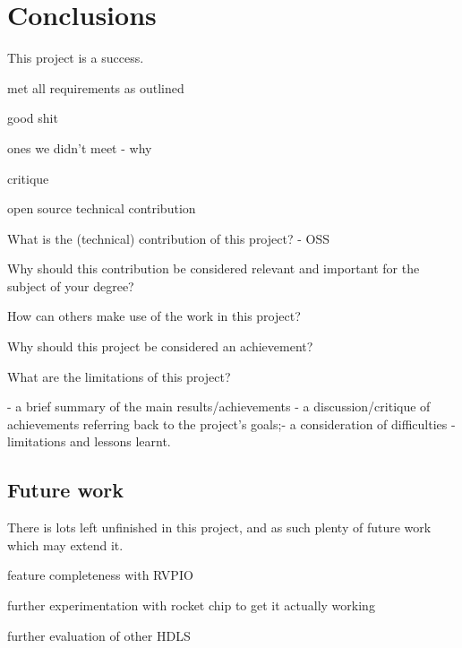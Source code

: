 \chapter{Conclusions}
\label{ch:conclusions}

This project is a success.

met all requirements as outlined

good shit

ones we didn't meet - why

critique

open source technical contribution






What is the (technical) contribution of this project? - OSS

Why should this contribution be considered relevant and important for the subject of your degree?

How can others make use of the work in this project?

Why should this project be considered an achievement?

What are the limitations of this project?

- a brief summary of the main results/achievements
- a discussion/critique of achievements referring back to the project's goals;- a consideration of difficulties
- limitations and lessons learnt.

\section{Future work}

There is lots left unfinished in this project, and as such plenty of future work which may extend it.

feature completeness with RVPIO 

further experimentation with rocket chip to get it actually working


further evaluation of other HDLS


